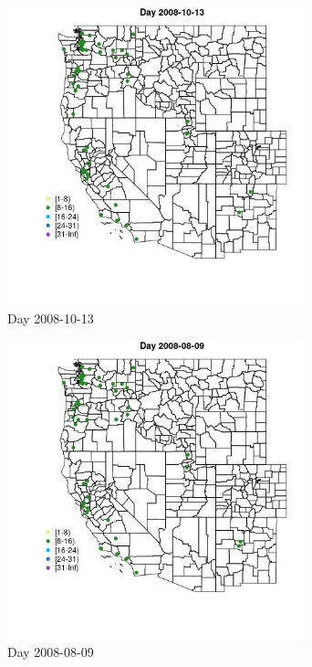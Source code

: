 \begin{figure} 
\centering  
\includegraphics[width=0.77\textwidth]{Code_Outputs/Report_ML_input_PM25_Step4_part_e_de_duplicated_aves_MapObsDay2008-10-13.jpg} 
\caption{\label{fig:Report_ML_input_PM25_Step4_part_e_de_duplicated_avesMapObsDay2008-10-13}Day 2008-10-13} 
\end{figure} 
 

\begin{figure} 
\centering  
\includegraphics[width=0.77\textwidth]{Code_Outputs/Report_ML_input_PM25_Step4_part_e_de_duplicated_aves_MapObsDay2008-08-09.jpg} 
\caption{\label{fig:Report_ML_input_PM25_Step4_part_e_de_duplicated_avesMapObsDay2008-08-09}Day 2008-08-09} 
\end{figure} 
 


